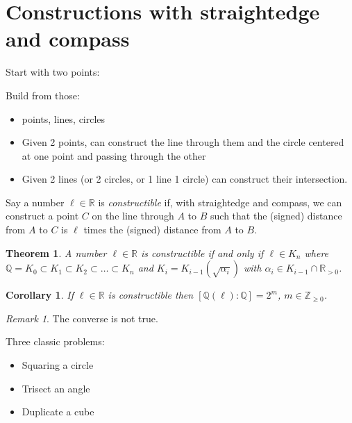 \documentclass{article}
\newcommand{\R}{\mathbb{R}}
\newcommand{\Z}{\mathbb{Z}}
\newcommand{\Q}{\mathbb{Q}}
\newtheorem*{theorem}{Theorem}
\newtheorem*{corollary}{Corollary}
\theoremstyle{definition}
\theoremstyle{remark}
\newtheorem*{remark}{Remark}
\begin{document}

\section*{Constructions with straightedge and compass}
Start with two points:

Build from those: 
\begin{itemize}
  \item points, lines, circles
  \item Given 2 points, can construct the line through them and the circle centered at one point and passing through the other
  \item Given 2 lines (or 2 circles, or 1 line 1 circle) can construct their intersection.
\end{itemize}

Say a number $\ell \in \R$ is \emph{constructible} if, with straightedge and compass, we can construct a point $C$ on the line through $A$ to $B$ such that the (signed) distance from $A$ to $C$ is $\ell$ times the (signed) distance from $A$ to $B$.

\begin{theorem}
  A number $\ell \in \R$ is constructible if and only if $\ell \in K_n$ where $\Q = K_0 \subset K_1 \subset K_2 \subset \ldots \subset K_n$ and $K_i = K_{i-1}(\sqrt{\alpha_i})$ with $\alpha_i \in K_{i-1} \cap \R_{> 0}$.
\end{theorem}

\begin{corollary}
  If $\ell \in \R$ is constructible then $[\Q(\ell): \Q] = 2^m$, $m \in \Z_{\geq 0}$.
\end{corollary}
\begin{remark}
  The converse is not true.
\end{remark}

Three classic problems:
\begin{itemize}
  \item Squaring a circle
  \item Trisect an angle
  \item Duplicate a cube
\end{itemize}
\end{document}
